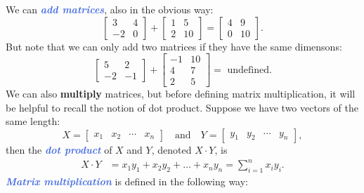 \documentclass[10pt]{article}
\newcommand{\demph}[1]{\textcolor{RoyalBlue}{\textbf{\slshape #1}}} %
\theoremstyle{definition}
\begin{document}
\noindent We can \demph{add matrices}, also in the obvious way:
\begin{equation*}
  \begin{bmatrix}
    3&4\\
    -2&0
  \end{bmatrix}
  +
  \begin{bmatrix}
    1&5\\
    2&10
  \end{bmatrix}
  =
  \begin{bmatrix}
    4&9\\
    0&10
  \end{bmatrix}.
\end{equation*}
But note that we can only add two matrices if they have the same dimensons:
\begin{equation*}
  \begin{bmatrix}
    5&2\\
    -2&-1
  \end{bmatrix}
  +
  \begin{bmatrix}
    -1&10\\
    4&7\\
    2&5
  \end{bmatrix}
  = \text{ undefined}.
\end{equation*}
We can also \textbf{multiply} matrices, but before defining matrix
multiplication, it will be helpful to recall the notion of dot product.
Suppose we have two vectors of the same length:
\begin{equation*}
  X =
  \begin{bmatrix}
    x_{1}&x_{2}&\cdots&x_{n}
  \end{bmatrix}
  \quad \text{and} \quad
  Y =
  \begin{bmatrix}
    y_{1}&y_{2}&\cdots&y_{n}
  \end{bmatrix},
\end{equation*}
then the \demph{dot product} of $X$ and $Y$, denoted $X\cdot Y$, is
\begin{align*}
  X\cdot Y 
  &= x_{1}y_{1}+ x_{2}y_{2}+\ldots+x_{n}y_{n} = \sum_{i=1}^{n}x_{i}y_{i}.
\end{align*}
\demph{Matrix multiplication} is defined in the following way:
\end{document}
